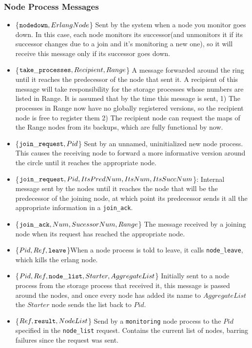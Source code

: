 \documentclass[a4paper]{article}
\begin{document}
\subsubsection{Node Process Messages}
\label{nodemsg}
\begin{itemize}
\item\{${\tt nodedown}, ErlangNode$\} Sent by the system when a node you monitor goes down. In this case, each node monitors its successor(and unmonitors it if its successor changes due to a join and it's monitoring a new one), so it will receive this message only if its successor goes down.
\item\{${\tt take\_processes}, Recipient, Range$\} A message forwarded around the ring until it reaches the predecessor of the node that sent it. A recipient of this message will take responsibility for the storage processes whose numbers are listed in Range. It is assumed that by the time this message is sent,
1) The processes in Range now have no globally registered versions, so the recipient node is free to register them
2) The recipient node can request the maps of the Range nodes from its backups, which are fully functional by now.
\item\{${\tt join\_request}, Pid$\} Sent by an unnamed, uninitialized new node process. This causes the receiving node to forward a more informative version around the circle until it reaches the appropriate node.
\item\{${\tt join\_request}, Pid, ItsPredNum, ItsNum, ItsSuccNum$\}: Internal message sent by the nodes until it reaches the node that will be the predecessor of the joining node, at which point its predecessor sends it all the appropriate information in a {\tt join\_ack}.
\item\{${\tt join\_ack}, Num, SucessorNum, Range$\} The message received by a joining node when its request has reached the appropriate node.
\item\{$Pid, Ref, {\tt leave}$\}When a node process is told to leave, it calls {\tt node\_leave}, which kills the erlang node.
\item\{$Pid, Ref, {\tt node\_list}, Starter, AggregateList$\} Initially sent to a node process from the storage process that received it, this message is passed around the nodes, and once every node has added its name to $AggregateList$ the $Starter$ node sends the list back to $Pid$.
\item\{$Ref, {\tt result}, NodeList$\} Send by a {\tt monitoring} node process to the $Pid$ specified in the {\tt node\_list} request. Contains the current list of nodes, barring failures since the request was sent.
\end{itemize}
\end{document}
